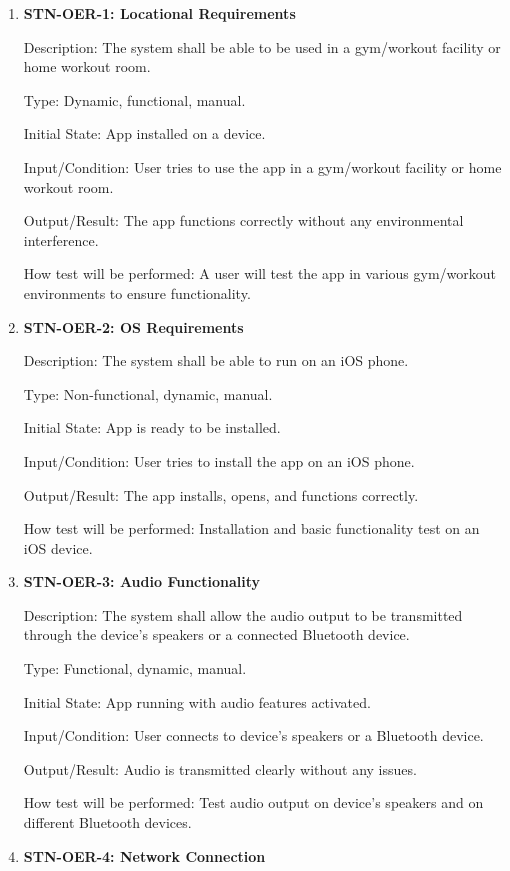 \documentclass[12pt, titlepage]{article}
\begin{document}
\begin{enumerate}

\item {\textbf{STN-OER-1: Locational Requirements}}

Description:  The system shall be able to be used in a gym/workout facility or home workout room. 

Type: Dynamic, functional, manual.

Initial State: App installed on a device.

Input/Condition: User tries to use the app in a gym/workout facility or home workout room.

Output/Result: The app functions correctly without any environmental interference.

How test will be performed: A user will test the app in various gym/workout environments to ensure functionality.


\item{\textbf{STN-OER-2: OS Requirements}}

Description: The system shall be able to run on an iOS phone.

Type: Non-functional, dynamic, manual.

Initial State: App is ready to be installed.

Input/Condition: User tries to install the app on an iOS phone.

Output/Result: The app installs, opens, and functions correctly.

How test will be performed: Installation and basic functionality test on an iOS device.


\item{\textbf{STN-OER-3: Audio Functionality}}

Description: The system shall allow the audio output to be transmitted through the device’s speakers or a connected Bluetooth device.

Type: Functional, dynamic, manual.

Initial State: App running with audio features activated.

Input/Condition: User connects to device’s speakers or a Bluetooth device.

Output/Result: Audio is transmitted clearly without any issues.

How test will be performed: Test audio output on device’s speakers and on different Bluetooth devices.


\item{\textbf{STN-OER-4: Network Connection}}


\end{enumerate}
\end{document}
